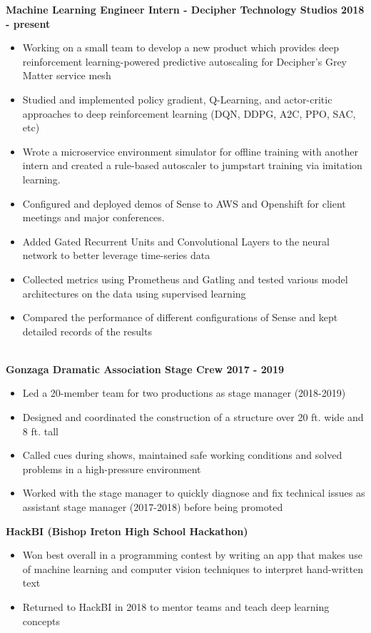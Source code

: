 \documentclass{article}
\begin{document}
\begin{center}
\begin{flushleft}
    \textbf{Machine Learning Engineer Intern - Decipher Technology Studios \hfill 2018 - present}
    \begin{itemize}
      \item Working on a small team to develop a new product which provides deep reinforcement learning-powered predictive autoscaling for Decipher’s Grey Matter service mesh
      \item Studied and implemented policy gradient, Q-Learning, and actor-critic approaches to deep reinforcement learning (DQN, DDPG, A2C, PPO, SAC, etc)
      \item Wrote a microservice environment simulator for offline training with another intern and created a rule-based autoscaler to jumpstart training via imitation learning.
      \item Configured and deployed demos of Sense to AWS and Openshift for client meetings and major conferences.
      \item Added Gated Recurrent Units and Convolutional Layers to the neural network to better leverage time-series data
      \item Collected metrics using Prometheus and Gatling and tested various model architectures on the data using supervised learning
      \item Compared the performance of different configurations of Sense and kept detailed records of the results
    \end{itemize}


    {\large\textbf{\underline{}}} \\
    \textbf{Gonzaga Dramatic Association Stage Crew \hfill 2017 - 2019}
    \begin{itemize}
      \item Led a 20-member team for two productions as stage manager (2018-2019)
      \item Designed and coordinated the construction of a structure over 20 ft. wide and 8 ft. tall
      \item Called cues during shows, maintained safe working conditions and solved problems in a high-pressure environment
      \item Worked with the stage manager to quickly diagnose and fix technical issues as assistant stage manager (2017-2018) before being promoted
    \end{itemize}

    \textbf{HackBI  (Bishop Ireton High School Hackathon)}

    \begin{itemize}
      \item Won best overall in a programming contest by writing an app that makes use of machine learning and computer vision techniques to interpret hand-written text
      \item Returned to HackBI in 2018 to mentor teams and teach deep learning concepts
    \end{itemize}


\end{flushleft}
\end{center}
\end{document}
